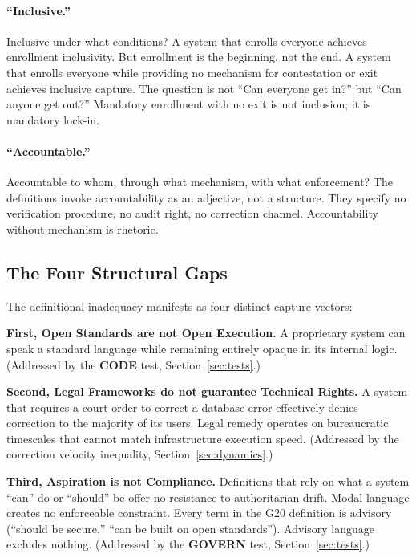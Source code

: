 \documentclass{article}
\begin{document}
\paragraph{``Inclusive.''}  Inclusive under what conditions? A system that enrolls everyone achieves enrollment inclusivity. But enrollment is the beginning, not the end. A system that enrolls everyone while providing no mechanism for contestation or exit achieves inclusive capture. The question is not ``Can everyone get in?'' but ``Can anyone get out?'' Mandatory enrollment with no exit is not inclusion; it is mandatory lock-in.

\paragraph{``Accountable.''}  Accountable to whom, through what mechanism, with what enforcement? The definitions invoke accountability as an adjective, not a structure. They specify no verification procedure, no audit right, no correction channel. Accountability without mechanism is rhetoric.

\subsection{The Four Structural Gaps}

The definitional inadequacy manifests as four distinct capture vectors:

\textbf{First, Open Standards are not Open Execution.} A proprietary system can speak a standard language while remaining entirely opaque in its internal logic. (Addressed by the \textbf{CODE} test, Section~\ref{sec:tests}.)

\textbf{Second, Legal Frameworks do not guarantee Technical Rights.} A system that requires a court order to correct a database error effectively denies correction to the majority of its users. Legal remedy operates on bureaucratic timescales that cannot match infrastructure execution speed. (Addressed by the correction velocity inequality, Section~\ref{sec:dynamics}.)

\textbf{Third, Aspiration is not Compliance.} Definitions that rely on what a system ``can'' do or ``should'' be offer no resistance to authoritarian drift. Modal language creates no enforceable constraint. Every term in the G20 definition is advisory (``should be secure,'' ``can be built on open standards''). Advisory language excludes nothing. (Addressed by the \textbf{GOVERN} test, Section~\ref{sec:tests}.)
\end{document}
